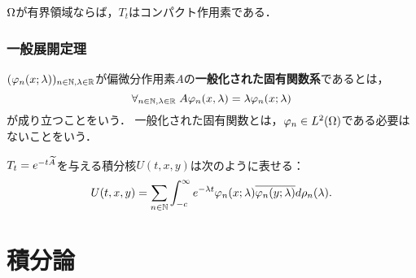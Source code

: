 \documentclass[uplatex,dvipdfmx]{jsreport}
\begin{document}
\begin{corollary}
    $\Omega$が有界領域ならば，$T_t$はコンパクト作用素である．
\end{corollary}

\subsection{一般展開定理}

\begin{definition}
    $(\varphi_n(x;\lambda))_{n\in\mathbb{N},\lambda\in\mathbb{R}}$が偏微分作用素$A$の\textbf{一般化された固有関数系}であるとは，
    \[\forall_{n\in\mathbb{N},\lambda\in\mathbb{R}}\;A\varphi_n(x,\lambda)=\lambda\varphi_n(x;\lambda)\]
    が成り立つことをいう．
    一般化された固有関数とは，$\varphi_n\in L^2(\Omega)$である必要はないことをいう．
\end{definition}

\begin{theorem}[一般展開定理]
    
\end{theorem}

\begin{theorem}
    $T_t=e^{-t\widetilde{A}}$を与える積分核$U(t,x,y)$は次のように表せる：
    \[U(t,x,y)=\sum_{n\in\mathbb{N}}\int_{-c}^\infty e^{-\lambda t}\varphi_n(x;\lambda)\overline{\varphi_n(y;\lambda)}d\rho_n(\lambda).\]
\end{theorem}

\chapter{積分論}
\end{document}
